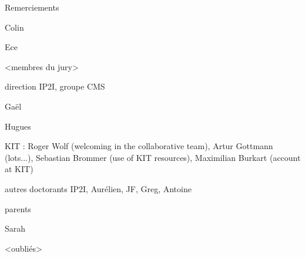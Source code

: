 Remerciements

Colin

Ece

<membres du jury>

direction IP2I, groupe CMS

Gaël

Hugues

KIT : Roger Wolf (welcoming in the collaborative team), Artur Gottmann (lots...), Sebastian Brommer (use of KIT resources), Maximilian Burkart (account at KIT)

autres doctorants IP2I, Aurélien, JF, Greg, Antoine

parents

Sarah

<oubliés>
